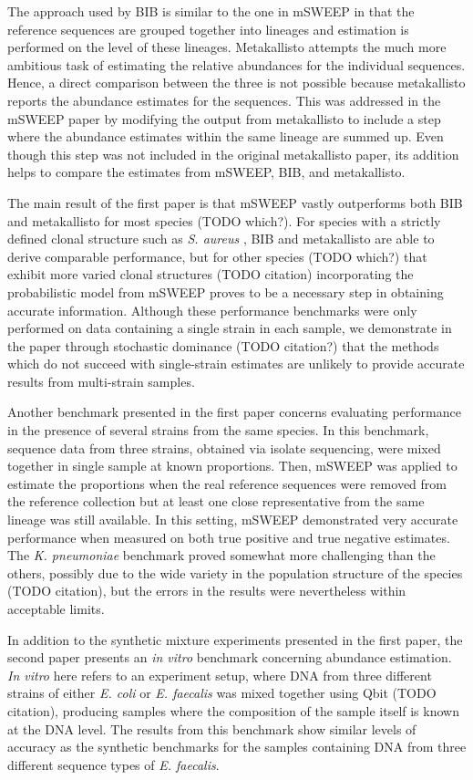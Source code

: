 \documentclass[officiallayout]{tktla}
\begin{document}
The approach used by BIB is similar to the one in mSWEEP in that the
reference sequences are grouped together into lineages and estimation
is performed on the level of these lineages. Metakallisto attempts the
much more ambitious task of estimating the relative abundances for the
individual sequences. Hence, a direct comparison between the three is
not possible because metakallisto reports the abundance estimates for
the sequences. This was addressed in the mSWEEP paper by modifying the
output from metakallisto to include a step where the abundance
estimates within the same lineage are summed up. Even though this step was
not included in the original metakallisto paper, its addition helps to
compare the estimates from mSWEEP, BIB, and metakallisto.

The main result of the first paper is that mSWEEP vastly outperforms
both BIB and metakallisto for most species (TODO which?). For species
with a strictly defined clonal structure \textemdash{ } such as
\textit{S. aureus} \textemdash{ }, BIB and metakallisto are able to
derive comparable performance, but for other species (TODO which?)
that exhibit more varied clonal structures (TODO citation)
incorporating the probabilistic model from mSWEEP proves to be a
necessary step in obtaining accurate information. Although these
performance benchmarks were only performed on data containing a single
strain in each sample, we demonstrate in the paper through stochastic
dominance (TODO citation?) that the methods which do not succeed with
single-strain estimates are unlikely to provide accurate results from
multi-strain samples.

Another benchmark presented in the first paper concerns evaluating
performance in the presence of several strains from the same
species. In this benchmark, sequence data from three strains, obtained
via isolate sequencing, were mixed together in single sample at known
proportions. Then, mSWEEP was applied to estimate the proportions when
the real reference sequences were removed from the reference
collection but at least one close representative from the same lineage
was still available. In this setting, mSWEEP demonstrated very
accurate performance when measured on both true positive and true
negative estimates. The \textit{K. pneumoniae} benchmark proved
somewhat more challenging than the others, possibly due to the wide
variety in the population structure of the species (TODO citation),
but the errors in the results were nevertheless within acceptable
limits.

In addition to the synthetic mixture experiments presented in the
first paper, the second paper presents an \textit{in vitro} benchmark
concerning abundance estimation. \textit{In vitro} here refers to an
experiment setup, where DNA from three different strains of either
\textit{E. coli} or \textit{E. faecalis} was mixed together using Qbit
(TODO citation), producing samples where the composition of the sample
itself is known at the DNA level. The results from this benchmark show
similar levels of accuracy as the synthetic benchmarks for the samples
containing DNA from three different sequence types of
\textit{E. faecalis}.
\end{document}
